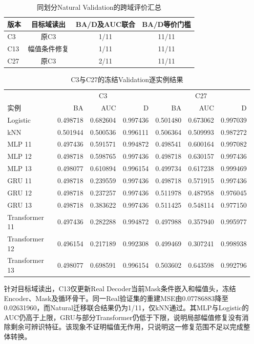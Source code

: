 \begin{table}[htbp]
 \centering\small
 \caption{同划分Natural Validation的跨域评价汇总}
 \label{tab:ch05_transfer_summary}
 \begin{tabular}{lccc}
 \hline
 版本&目标域读出&BA/D及AUC联合&BA/D等价门槛\\\hline
 C3&原C3&1/11&11/11\\
 C13&幅值条件修复&1/11&11/11\\
 C27&原C3&2/11&11/11\\\hline
 \end{tabular}
\end{table}
\begin{table}[htbp]
 \centering\footnotesize
 \caption{C3与C27的冻结Validation逐实例结果}
 \label{tab:ch05_validation_instances}
 \begin{tabular}{lrrrrrr}
 \hline
 &\multicolumn{3}{c}{C3}&\multicolumn{3}{c}{C27}\\
 实例&BA&AUC&D&BA&AUC&D\\\hline
Logistic&0.498718&0.682604&0.997436&0.501480&0.673062&0.997039\\
kNN&0.501944&0.500536&0.996111&0.506364&0.509993&0.987272\\
MLP 11&0.497436&0.591571&0.994872&0.498541&0.600164&0.997082\\
MLP 12&0.498718&0.598765&0.997436&0.498718&0.630157&0.997436\\
MLP 13&0.498077&0.610894&0.996154&0.499734&0.617238&0.999469\\
GRU 11&0.498718&0.239559&0.997436&0.498718&0.571915&0.997436\\
GRU 12&0.498718&0.237257&0.997436&0.511978&0.487958&0.976045\\
GRU 13&0.498718&0.383622&0.997436&0.511425&0.548114&0.977150\\
Transformer 11&0.497436&0.282288&0.994872&0.497988&0.357940&0.995977\\
Transformer 12&0.496154&0.217189&0.992308&0.499469&0.307241&0.998938\\
Transformer 13&0.498077&0.698591&0.996154&0.503602&0.643598&0.992796\\
 \hline
 \end{tabular}
\end{table}

针对目标域读出，C13仅更新Real Decoder当前Mask条件嵌入和幅值头，冻结Encoder、Mask及循环骨干。同一Real验证集的重建MSE由0.07786883降至0.02631960，而Natural迁移联合结果仍为1/11，仅kNN通过。其MLP与Logistic的AUC仍高于上限，GRU与部分Transformer仍低于下限，说明局部幅值修复没有消除剩余可辨识特征。该现象不证明幅值无作用，只说明这一修复范围不足以完成整体转换。

